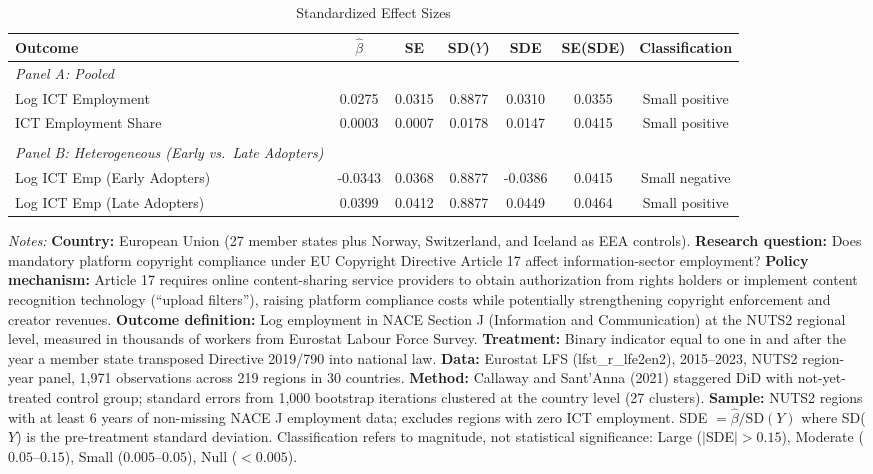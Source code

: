 \begin{table}[htbp]
\centering
\caption{Standardized Effect Sizes}
\label{tab:sde}
\begin{adjustbox}{max width=\textwidth}
\begin{tabular}{lcccccc}
\toprule
Outcome & $\hat{\beta}$ & SE & SD($Y$) & SDE & SE(SDE) & Classification \\
\midrule
\textit{Panel A: Pooled} & & & & & & \\[0.3em]
Log ICT Employment & 0.0275 & 0.0315 & 0.8877 & 0.0310 & 0.0355 & Small positive \\
ICT Employment Share & 0.0003 & 0.0007 & 0.0178 & 0.0147 & 0.0415 & Small positive \\
\\[-0.3em]
\textit{Panel B: Heterogeneous (Early vs.\ Late Adopters)} & & & & & & \\[0.3em]
Log ICT Emp (Early Adopters) & -0.0343 & 0.0368 & 0.8877 & -0.0386 & 0.0415 & Small negative \\
Log ICT Emp (Late Adopters) & 0.0399 & 0.0412 & 0.8877 & 0.0449 & 0.0464 & Small positive \\
\bottomrule
\end{tabular}
\end{adjustbox}
\begin{tablenotes}
\small
\item \textit{Notes:} \textbf{Country:} European Union (27 member states plus Norway, Switzerland, and Iceland as EEA controls). \textbf{Research question:} Does mandatory platform copyright compliance under EU Copyright Directive Article 17 affect information-sector employment? \textbf{Policy mechanism:} Article 17 requires online content-sharing service providers to obtain authorization from rights holders or implement content recognition technology (``upload filters''), raising platform compliance costs while potentially strengthening copyright enforcement and creator revenues. \textbf{Outcome definition:} Log employment in NACE Section J (Information and Communication) at the NUTS2 regional level, measured in thousands of workers from Eurostat Labour Force Survey. \textbf{Treatment:} Binary indicator equal to one in and after the year a member state transposed Directive 2019/790 into national law. \textbf{Data:} Eurostat LFS (lfst\_r\_lfe2en2), 2015--2023, NUTS2 region-year panel, 1,971 observations across 219 regions in 30 countries. \textbf{Method:} Callaway and Sant'Anna (2021) staggered DiD with not-yet-treated control group; standard errors from 1,000 bootstrap iterations clustered at the country level (27 clusters). \textbf{Sample:} NUTS2 regions with at least 6 years of non-missing NACE J employment data; excludes regions with zero ICT employment. SDE $= \hat{\beta} / \text{SD}(Y)$ where SD($Y$) is the pre-treatment standard deviation. Classification refers to magnitude, not statistical significance: Large ($|$SDE$| > 0.15$), Moderate ($0.05$--$0.15$), Small ($0.005$--$0.05$), Null ($< 0.005$).
\end{tablenotes}
\end{table}
